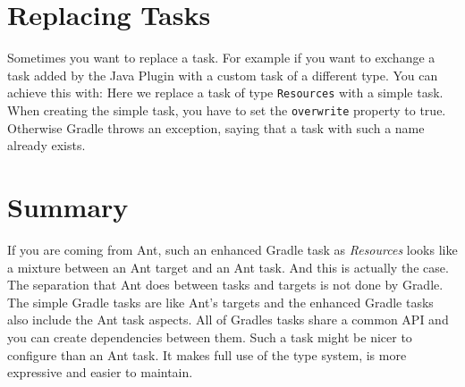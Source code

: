 \section{Replacing Tasks}
Sometimes you want to replace a task. For example if you want to exchange a task added by the Java Plugin with a custom task of a different type. You can achieve this with:
Here we replace a task of type \texttt{Resources} with a simple task. When creating the simple task, you have to set the \texttt{overwrite} property to true. Otherwise Gradle throws an exception, saying that a task with such a name already exists.

\section{Summary} %
\label{sec:the_idea_behind_gradle_tasks}
If you are coming from Ant, such an enhanced Gradle task as \emph{Resources} looks like a mixture between an Ant target and an Ant task. And this is actually the case. The separation that Ant does between tasks and targets is not done by Gradle. The simple Gradle tasks are like Ant's targets and the enhanced Gradle tasks also include the Ant task aspects. All of Gradles tasks share a common API and you can create dependencies between them. Such a task might be nicer to configure than an Ant task. It makes full use of the type system, is more expressive and easier to maintain.



